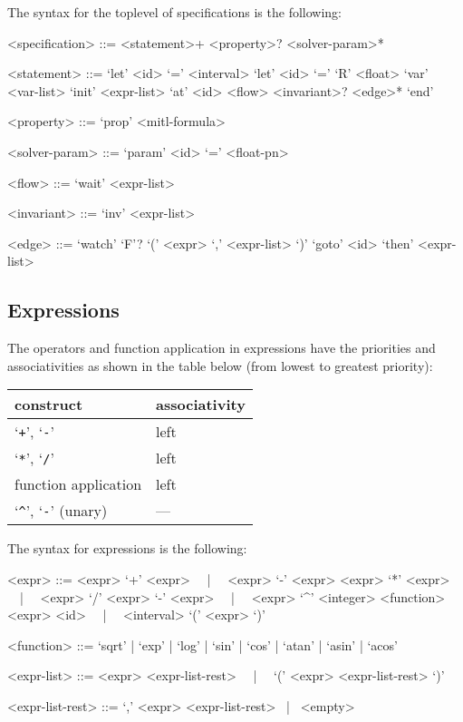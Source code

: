 \documentclass[10pt,a4paper]{article}
\begin{document}
The syntax for the toplevel of specifications is the following:
\begin{grammar}
<specification> ::= <statement>+ <property>? <solver-param>*

<statement> ::= 
`let' <id> `=' <interval>
\alt `let' <id> `=' `R' <float>
\alt `var' <var-list>
\alt `init' <expr-list>
\alt `at' <id> <flow> <invariant>? <edge>* `end'

<property> ::= `prop' <mitl-formula>

<solver-param> ::= `param' <id> `=' <float-pn>


<flow> ::= `wait' <expr-list>

<invariant> ::= `inv' <expr-list>

<edge> ::= `watch' `F'? `(' <expr> `,' <expr-list> `)' `goto' <id> `then' <expr-list>
\end{grammar}


\subsection{Expressions}

The operators and function application in expressions have the priorities and associativities as shown in the table below (from lowest to greatest priority):
\begin{table}[ht]
	\centering
    \begin{tabular}{|l|l|} \hline
		construct & associativity \\
		\hline
		`\texttt{+}', `\texttt{-}' & left \\
		`\texttt{*}', `\texttt{/}' & left \\
		function application & left \\
		`\texttt{\^}', `\texttt{-}' (unary) & --- \\
		\hline
	\end{tabular}
\end{table}

The syntax for expressions is the following:
\begin{grammar}
<expr> ::= <expr> `+' <expr> ~~|~~ <expr> `-' <expr>
\alt <expr> `*' <expr> ~~|~~ <expr> `/' <expr>
\alt `-' <expr> ~~|~~ <expr> `^' <integer>
\alt <function> <expr>
\alt <id> ~~|~~ <interval>
\alt `(' <expr> `)' 

<function> ::= `sqrt' | `exp' | `log' | `sin' | `cos' | `atan' | `asin' | `acos'

<expr-list> ::= <expr> <expr-list-rest> ~~|~~ `(' <expr> <expr-list-rest> `)'

<expr-list-rest> ::= `,' <expr> <expr-list-rest> ~|~ <empty>
\end{grammar}
\end{document}
